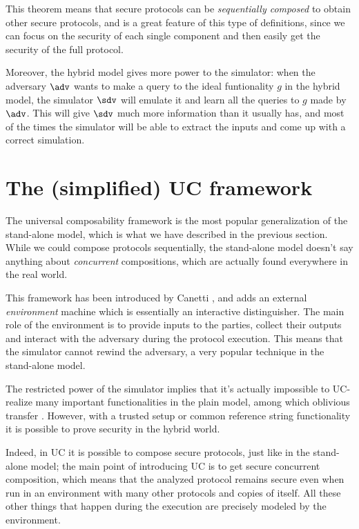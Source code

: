 This theorem means that secure protocols can be \emph{sequentially composed} to obtain other secure protocols, and is a great feature of this type of definitions, since we can focus on the security of each single component and then easily get the security of the full protocol.

Moreover, the hybrid model gives more power to the simulator: when the adversary $\adv$ wants to make a query to the ideal funtionality $g$ in the hybrid model, the simulator $\sdv$ will emulate it and learn all the queries to $g$ made by $\adv$. This will give $\sdv$ much more information than it usually has, and most of the times the simulator will be able to extract the inputs and come up with a correct simulation.

\section{The (simplified) UC framework}
The universal composability framework is the most popular generalization of the stand-alone model, which is what we have described in the previous section. While we could compose protocols sequentially, the stand-alone model doesn't say anything about \emph{concurrent} compositions, which are actually found everywhere in the real world.

This framework has been introduced by Canetti \cite{Canetti_UC}, and adds an external \emph{environment} machine which is essentially an interactive distinguisher. The main role of the environment is to provide inputs to the parties, collect their outputs and interact with the adversary during the protocol execution. This means that the simulator cannot rewind the adversary, a very popular technique in the stand-alone model.

The restricted power of the simulator implies that it's actually impossible to UC-realize many important functionalities in the plain model, among which oblivious transfer \cite{Canetti_limitations}. However, with a trusted setup or common reference string functionality it is possible to prove security in the hybrid world.

Indeed, in UC it is possible to compose secure protocols, just like in the stand-alone model; the main point of introducing UC is to get secure concurrent composition, which means that the analyzed protocol remains secure even when run in an environment with many other protocols and copies of itself. All these other things that happen during the execution are precisely modeled by the environment.

